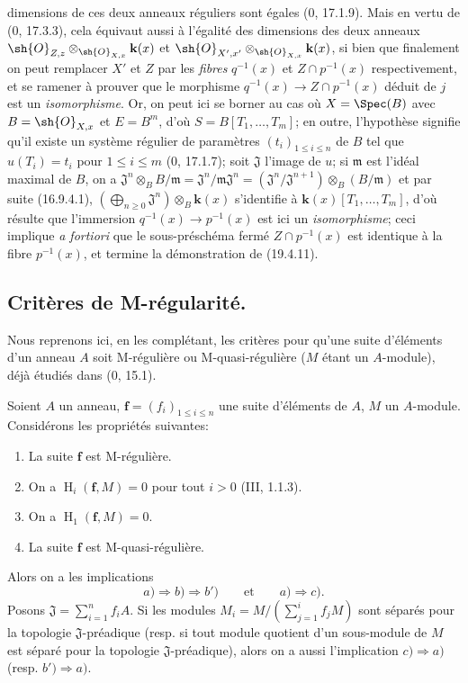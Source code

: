 dimensions de ces deux anneaux réguliers sont égales ($0$, 17.1.9). Mais en vertu de ($0$, 17.3.3), cela équivaut aussi à l'égalité des dimensions des deux anneaux $\sh{O}_{Z,z}\otimes_{\sh{O}_{X,x}}\mathbf k(x)$ et $\sh{O}_{X',x'}\otimes_{\sh{O}_{X,x}}\mathbf k(x)$, si bien que finalement on peut remplacer $X'$ et $Z$ par les \emph{fibres} $q^{-1}(x)$ et $Z\cap p^{-1}(x)$ respectivement, et se ramener à prouver que le morphisme $q^{-1}(x)\to Z\cap p^{-1}(x)$ déduit de $j$ est un \emph{isomorphisme}. Or, on peut ici se borner au cas où $X=\Spec(B)$ avec $B=\sh{O}_{X,x}$ et $E=B^m$, d'où $S=B[T_1,\ldots,T_m]$; en outre, l'hypothèse signifie qu'il existe un système régulier de paramètres $(t_i)_{1\leq i\leq n}$ de $B$ tel que $u(T_i)=t_i$ pour $1\leq i\leq m$ ($0$, 17.1.7); soit $\mathfrak J$ l'image de $u$; si $\mathfrak m$ est l'idéal maximal de $B$, on a $\mathfrak J^n\otimes_B B/\mathfrak m=\mathfrak J^n/\mathfrak m\mathfrak J^n=(\mathfrak J^n/\mathfrak J^{n+1})\otimes_B(B/\mathfrak m)$ et par suite (16.9.4.1), $(\bigoplus_{n\geq0}\mathfrak J^n)\otimes_B\mathbf k(x)$ s'identifie à $\mathbf k(x)[T_1,\ldots,T_m]$, d'où résulte que l'immersion $q^{-1}(x)\to p^{-1}(x)$ est ici un \emph{isomorphisme}; ceci implique \emph{a fortiori} que le sous-préschéma fermé $Z\cap p^{-1}(x)$ est identique à la fibre $p^{-1}(x)$, et termine la démonstration de (19.4.11).

\subsection{Critères de M-régularité.}
\label{subsection:IV.19.5}

Nous reprenons ici, en les complétant, les critères pour qu'une suite d'éléments d'un anneau $A$ soit M-régulière ou M-quasi-régulière ($M$ étant un $A$-module), déjà étudiés dans ($0$, 15.1).

\begin{theorem}[19.5.1]
\label{IV.19.5.1}
Soient $A$ un anneau, $\mathbf f=(f_i)_{1\leq i\leq n}$ une suite d'éléments de $A$, $M$ un $A$-module. Considérons les propriétés suivantes:
\begin{enumerate}
  \item[a)] La suite $\mathbf f$ est M-régulière.
  \item[b)] On a $\operatorname{H}_i(\mathbf f,M)=0$ pour tout $i>0$ (III, 1.1.3).
  \item[b$'$)] On a $\operatorname{H}_1(\mathbf f,M)=0$.
  \item[c)] La suite $\mathbf f$ est M-quasi-régulière.
\end{enumerate}
Alors on a les implications
\[
  a)\Rightarrow b)\Rightarrow b')\qquad\text{et}\qquad a)\Rightarrow c).
\]
Posons $\mathfrak J=\sum_{i=1}^n f_iA$. Si les modules $M_i=M/(\sum_{j=1}^i f_jM)$ sont séparés pour la topologie $\mathfrak J$-préadique (resp. si tout module quotient d'un sous-module de $M$ est séparé pour la topologie $\mathfrak J$-préadique), alors on a aussi l'implication $c)\Rightarrow a)$ (resp. $b')\Rightarrow a)$.
\end{theorem}

